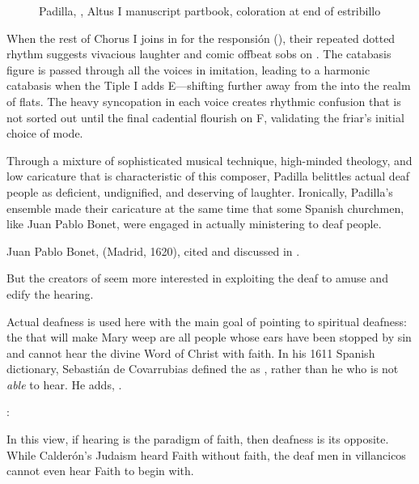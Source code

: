 \begin{figure}
    \caption{Padilla, , Altus I manuscript 
    partbook, coloration at end of estribillo}
    \label{figure:Padilla-Sordo1651-AI-coloration}
\end{figure}


When the rest of Chorus I joins in for the responsión
(), their repeated dotted 
rhythm suggests vivacious laughter and comic offbeat sobs on .
The catabasis figure is passed through all the voices in imitation, leading to 
a harmonic catabasis when the Tiple I adds E\fl{}---shifting further away from 
the  into the  realm of flats.
The heavy syncopation in each voice creates rhythmic confusion that is not 
sorted out until the final cadential flourish on F, validating the friar's 
initial choice of mode.

\begin{exmusic}
    \caption{Padilla, , , extant voices}
    \label{exmusic:Padilla-Sordo-responsion}
\end{exmusic}

Through a mixture of sophisticated musical technique, high-minded theology, and 
low caricature that is characteristic of this composer, Padilla belittles 
actual deaf people as deficient, undignified, and deserving of laughter.
Ironically, Padilla's ensemble made their caricature at the same time that some 
Spanish churchmen, like Juan Pablo Bonet, were engaged in actually ministering 
to deaf people.%
\begin{Footnote}
    Juan Pablo Bonet,  (Madrid, 1620), cited and discussed in 
    \autocite{Plann:DeafEducationSpain}.
\end{Footnote}
But the creators of  seem more interested in 
exploiting the deaf to amuse and edify the hearing.

Actual deafness is used here with the main goal of pointing to spiritual 
deafness: the  that will make Mary weep are all people whose 
ears have been stopped by sin and cannot hear the divine Word of Christ with 
faith.
In his 1611 Spanish dictionary, Sebastián de Covarrubias defined the 
 as , rather than he who is not 
\emph{able} to hear.
He adds, .%
\begin{Footnote}
    \Autocite[]{Covarrubias:Tesoro}:
\end{Footnote}
In this view, if hearing is the paradigm of faith, then deafness is its 
opposite.
While Calderón's Judaism heard Faith without faith, the deaf men in villancicos 
cannot even hear Faith to begin with.

